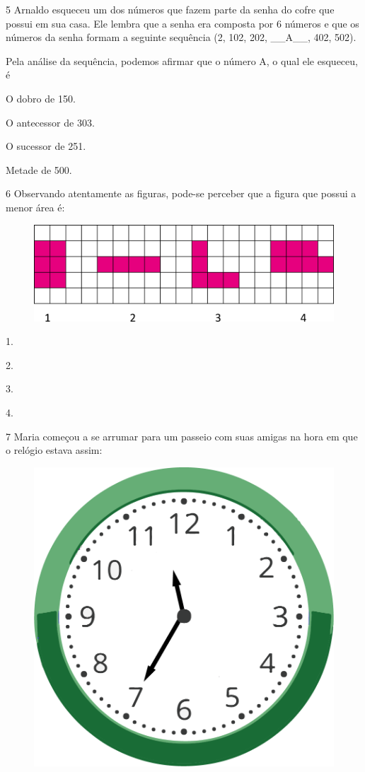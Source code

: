 \num{5} Arnaldo esqueceu um dos números que fazem parte da senha do cofre que
possui em sua casa. Ele lembra que a senha era composta por 6 números e
que os números da senha formam a seguinte sequência (2, 102, 202,
\_\_A\_\_, 402, 502).

Pela análise da sequência, podemos afirmar que o número A, o qual ele esqueceu, é

\begin{multicols}{2}
\begin{escolha}
\item
  O dobro de 150.
\item
  O antecessor de 303.
\item
  O sucessor de 251.
\item
  Metade de 500.
\end{escolha}
\end{multicols}

\pagebreak
\num{6} Observando atentamente as figuras, pode-se perceber que a figura que possui a menor área é:

\begin{figure}[htpb!]
\centering
\includegraphics[width=\textwidth]{./media/image115.png}
\end{figure}

\begin{escolha}
\item
  1.
\item
  2.
\item
  3.
\item
  4.
\end{escolha}


\num{7} Maria começou a se arrumar para um passeio com suas amigas na hora em que o relógio estava assim:

\begin{figure}[htpb!]
\centering
\includegraphics[width=.5\textwidth]{./media/image116.png}
\end{figure}

